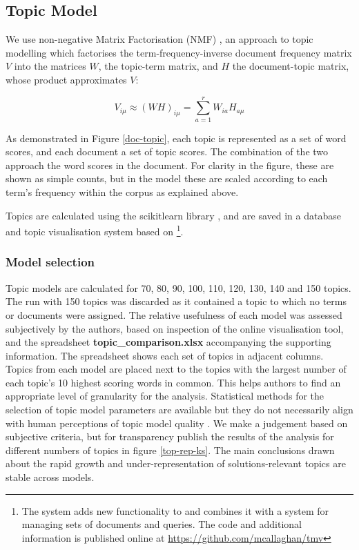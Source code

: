 \documentclass{article}
\begin{document}
\begin{linenumbers}
		\subsection*{Topic Model}
		
		We use non-negative Matrix Factorisation (NMF) \cite{Lee1999}, an approach to topic modelling which factorises the term-frequency-inverse document frequency matrix \( V \) into the matrices \(W\), the topic-term matrix, and \( H \) the document-topic matrix, whose product approximates \(V\):
		
		\begin{equation}
		V_{i\mu} \approx (WH)_{i\mu} = \sum_{a=1}^{r}W_{ia}H_{a\mu}
		\end{equation}
		
		As demonstrated in Figure \ref{doc-topic}, each topic is represented as a set of word scores, and each document a set of topic scores. The combination of the two approach the word scores in the document. For clarity in the figure, these are shown as simple counts, but in the model these are scaled according to each term's frequency within the corpus as explained above.
		
		Topics are calculated using the scikitlearn library \cite{Pedregosa2011}, and are saved in a database and topic visualisation system based on \cite{Chaney2012} \footnote{The system adds new functionality to \cite{Chaney2012} and combines it with a system for managing sets of documents and queries. The code and additional information is published online at \url{https://github.com/mcallaghan/tmv}}. 	
		
		\subsubsection*{Model selection}
		
		Topic models are calculated for 70, 80, 90, 100, 110, 120, 130, 140 and 150 topics. The run with 150 topics was discarded as it contained a topic to which no terms or documents were assigned. The relative usefulness of each model was assessed subjectively by the authors, based on inspection of the online visualisation tool, and the spreadsheet \textbf{topic\_comparison.xlsx} accompanying the supporting information. The spreadsheet shows each set of topics in adjacent columns. Topics from each model are placed next to the topics with the largest number of each topic's 10 highest scoring words in common. This helps authors to find an appropriate level of granularity for the analysis. Statistical methods for the selection of topic model parameters are available but they do not necessarily align with human perceptions of topic model quality \cite{Chang2009}. We make a judgement based on subjective criteria, but for transparency publish the results of the analysis for different numbers of topics in figure \ref{top-rep-ks}. The main conclusions drawn about the rapid growth and under-representation of solutions-relevant topics are stable across models.
		

\end{linenumbers}
\end{document}
